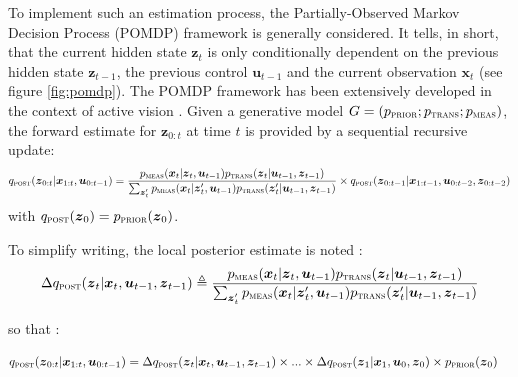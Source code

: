 \documentclass[12pt,twoside,openright]{article}
\begin{document}
To implement such an estimation process, the Partially-Observed Markov Decision Process (POMDP) framework is generally considered. It tells, in short, that the current hidden state $\boldsymbol{z}_t$ is only conditionally dependent on the previous hidden state $\boldsymbol{z}_{t-1}$, the previous control $\boldsymbol{u}_{t-1}$ and the current observation $\boldsymbol{x}_t$ (see figure \ref{fig:pomdp}). 
The POMDP framework has been extensively developed in the context of active vision \cite{butko2010infomax,ahmad2013active,potthast2016active}.
Given a generative model $G = (p_\text{\sc prior}; p_\text{\sc trans}; p_\text{\sc meas})$, the forward estimate for $\boldsymbol{z}_{0:t}$ at time $t$ is provided by a sequential recursive update: 
$$q_\text{\sc post}(\boldsymbol{z}_{0:t}|\boldsymbol{x}_{1:t},\boldsymbol{u}_{0:t-1}) 
= \frac{p_\text{\sc meas}(\boldsymbol{x}_t|\boldsymbol{z}_t,\boldsymbol{u}_{t-1}) p_\text{\sc trans}(\boldsymbol{z}_t|\boldsymbol{u}_{t-1},\boldsymbol{z}_{t-1})}
{\sum_{\boldsymbol{z}_t'}p_\text{\sc meas}(\boldsymbol{x}_t|\boldsymbol{z}_t',\boldsymbol{u}_{t-1}) p_\text{\sc trans}(\boldsymbol{z}_t'|\boldsymbol{u}_{t-1},\boldsymbol{z}_{t-1})} \times q_\text{\sc post}(\boldsymbol{z}_{0:t-1}|\boldsymbol{x}_{1:t-1},\boldsymbol{u}_{0:t-2}, \boldsymbol{z}_{0:t-2}) \label{eq:post-pompd}$$
with $q_\text{\sc post}(\boldsymbol{z}_0) = p_\text{\sc prior}(\boldsymbol{z}_0)$.

To simplify writing, the local posterior estimate is noted :
$$ \Delta q_\text{\sc post}(\boldsymbol{z}_t|\boldsymbol{x}_t,\boldsymbol{u}_{t-1}, \boldsymbol{z}_{t-1}) 
\triangleq \frac{p_\text{\sc meas}(\boldsymbol{x}_t|\boldsymbol{z}_t,\boldsymbol{u}_{t-1}) p_\text{\sc trans}(\boldsymbol{z}_t|\boldsymbol{u}_{t-1},\boldsymbol{z}_{t-1})}
{\sum_{\boldsymbol{z}_t'}p_\text{\sc meas}(\boldsymbol{x}_t|\boldsymbol{z}_t',\boldsymbol{u}_{t-1}) p_\text{\sc trans}(\boldsymbol{z}_t'|\boldsymbol{u}_{t-1},\boldsymbol{z}_{t-1})}
$$

so that :

\begin{align}
q_\text{\sc post}(\boldsymbol{z}_{0:t}|\boldsymbol{x}_{1:t},\boldsymbol{u}_{0:t-1}) 
&= \Delta q_\text{\sc post}(\boldsymbol{z}_t|\boldsymbol{x}_t,\boldsymbol{u}_{t-1}, \boldsymbol{z}_{t-1})  
\times ... \times \Delta q_\text{\sc post}(\boldsymbol{z}_1|\boldsymbol{x}_1,\boldsymbol{u}_0, \boldsymbol{z}_0)  \times  p_\text{\sc prior}(\boldsymbol{z}_0) \nonumber
\end{align}
\end{document}
